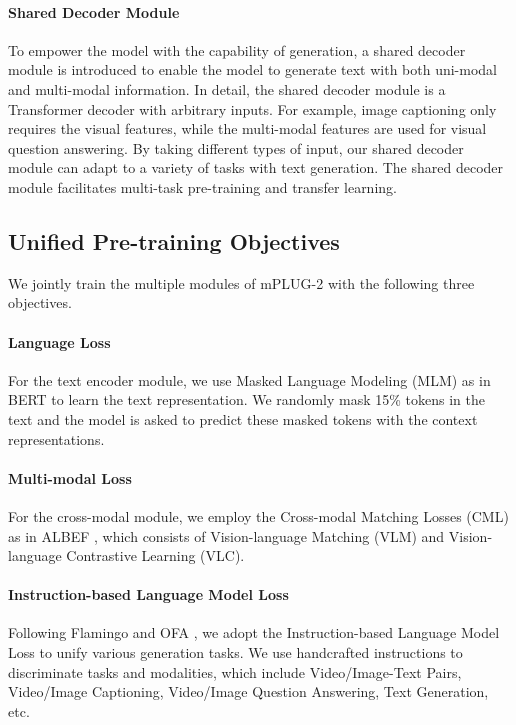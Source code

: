 \documentclass{article}
\theoremstyle{plain}
\theoremstyle{definition}
\theoremstyle{remark}
\newcommand{\modelname}{mPLUG-2 }
\begin{document}
\vspace{-2ex}
\paragraph{Shared Decoder Module}
To empower the model with the capability of generation, a shared decoder module is introduced to enable the model to generate text with both uni-modal and multi-modal information. In detail, the shared decoder module is a Transformer decoder with arbitrary inputs. For example, image captioning only requires the visual features, while the multi-modal features are used for visual question answering. By taking different types of input, our shared decoder module can adapt to a variety of tasks with text generation. The shared decoder module facilitates multi-task pre-training and transfer learning.

\vspace{-2ex}
\subsection{Unified Pre-training Objectives}
We jointly train the multiple modules of \modelname with the following three objectives.

\vspace{-2ex}
\paragraph{Language Loss}
For the text encoder module, we use Masked Language Modeling (MLM) as in BERT \citep{devlin2018bert} to learn the text representation. We randomly mask 15\% tokens in the text and the model is asked to predict these masked tokens with the context representations.
\vspace{-2ex}
\paragraph{Multi-modal Loss}
For the cross-modal module, we employ the Cross-modal Matching Losses (CML) as in ALBEF \citep{li2021align}, which consists of Vision-language Matching (VLM) and Vision-language Contrastive Learning (VLC). 
\vspace{-2ex}
\paragraph{Instruction-based Language Model Loss}
Following Flamingo \citep{Alayrac2022FlamingoAV} and OFA \citep{Wang2022OFA}, we adopt the Instruction-based Language Model Loss to unify various generation tasks. We use handcrafted instructions to discriminate tasks and modalities, which include Video/Image-Text Pairs, Video/Image Captioning, Video/Image Question Answering, Text Generation, etc. 
\end{document}
